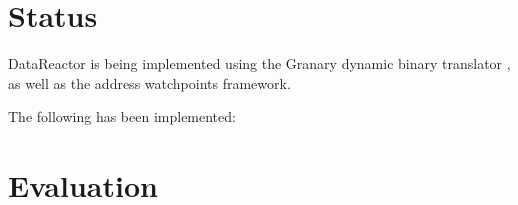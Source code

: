 \documentclass{sig-alternate}
\newcommand{\Toolname}{DataReactor}
\begin{document}

\section{Status}\label{sec:status}
\Toolname{} is being implemented using the Granary dynamic binary translator \cite{Granary}, as well as the address watchpoints
\cite{AddressWatchpoints} framework.

The following has been implemented:

\section{Evaluation}\label{sec:evaluation}




\end{document}

